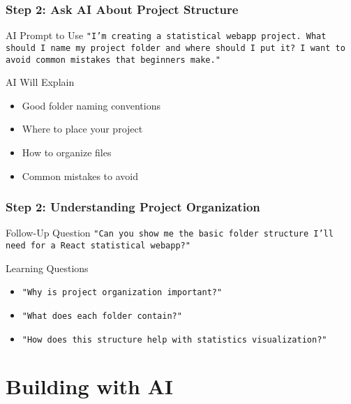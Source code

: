\documentclass[aspectratio=169]{beamer}
\begin{document}
\begin{frame}
\frametitle{Step 2: Ask AI About Project Structure}
\begin{alertblock}{AI Prompt to Use}
\texttt{"I'm creating a statistical webapp project. What should I name my project folder and where should I put it? I want to avoid common mistakes that beginners make."}
\end{alertblock}

\begin{exampleblock}{AI Will Explain}
\begin{itemize}
\item Good folder naming conventions
\item Where to place your project
\item How to organize files
\item Common mistakes to avoid
\end{itemize}
\end{exampleblock}
\end{frame}

\begin{frame}
\frametitle{Step 2: Understanding Project Organization}
\begin{alertblock}{Follow-Up Question}
\texttt{"Can you show me the basic folder structure I'll need for a React statistical webapp?"}
\end{alertblock}

\begin{exampleblock}{Learning Questions}
\begin{itemize}
\item \texttt{"Why is project organization important?"}
\item \texttt{"What does each folder contain?"}
\item \texttt{"How does this structure help with statistics visualization?"}
\end{itemize}
\end{exampleblock}
\end{frame}

\section{Building with AI}
\end{document}
